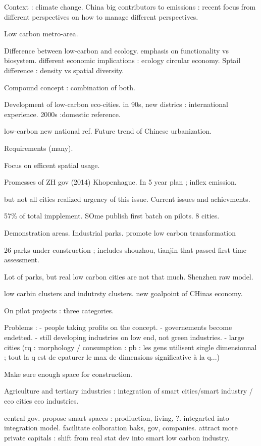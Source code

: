 \documentclass[11pt]{article}
\begin{document}
Context : climate change. China big contributors to emissions : recent focus from different perspectives on how to manage different perspectives.

Low carbon metro-area.


Difference between low-carbon and ecology. emphasis on functionality vs biosystem. different economic implications : ecology circular economy.
Sptail difference : density vs spatial diversity.

Compound concept : combination of both.

Development of low-carbon eco-cities. in 90s, new districs : international experience. 2000s :domestic reference.

low-carbon new national ref. Future trend of Chinese urbanization.

Requirements (many).

Focus on efficent spatial usage.

Promesses of ZH gov (2014) Khopenhague. In 5 year plan ; inflex emission.

but not all cities realized urgency of this issue. Current issues and achievments.

57\% of total impplement. SOme publish first batch on pilots. 8 cities. 

Demonstration areas. Industrial parks. promote low carbon transformation

26 parks under construction ; includes shouzhou, tianjin that passed first time assessment.


Lot of parks, but real low carbon cities are not that much. Shenzhen raw model.

low carbin clusters and indutrsty clusters. new goalpoint of CHinas economy.

On pilot projects : three categories.

Problems :
 - people taking profits on the concept.
- governements become endetted.
- still developing industries on low end, not green industries.
- large cities
(rq : morphology / consumption : pb : les gens utilisent single dimensionnal ; tout la q est de cpaturer le max de dimensions significative à la q...)

Make sure enough space for construction.


Agriculture and tertiary industries : integration of smart cities/smart industry / eco cities eco industries.

central gov. propose smart spaces : prodiuction, living, ?. integarted into integration model. facilitate colboration baks, gov, companies. attract more private capitals : shift from real stat dev into smart low carbon industry.
\end{document}
